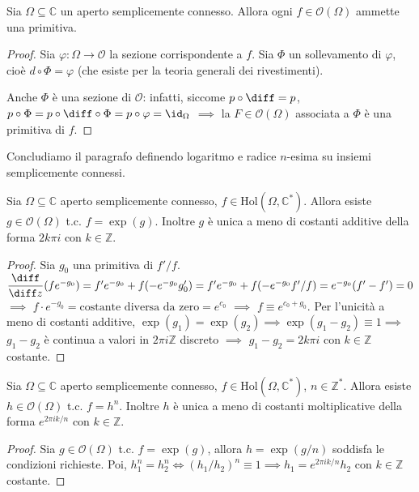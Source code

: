 \begin{thm}
  Sia $\Omega \subseteq \mathbb{C}$ un aperto semplicemente connesso. Allora ogni $f \in \mathcal{O}(\Omega)$ ammette una primitiva.
\end{thm}

\begin{proof}
  Sia $\varphi:\Omega \longrightarrow \mathcal{O}$ la sezione corrispondente a $f$. Sia $\Phi$ un sollevamento di $\varphi$, cioè $d \circ \Phi=\varphi$ (che esiste per la teoria generali dei rivestimenti).
  \begin{center}
  \end{center}
  Anche $\Phi$ è una sezione di $\mathcal{O}$: infatti, siccome $p \circ \diff=p$, $p \circ \Phi=p\circ\diff\circ\Phi=p\circ\varphi=\id_{\Omega}$ $\implies$ la $F \in \mathcal{O}(\Omega)$ associata a $\Phi$ è una primitiva di $f$.
\end{proof}

Concludiamo il paragrafo definendo logaritmo e radice $n$-esima su insiemi semplicemente connessi.

\begin{cor}
  Sia $\Omega \subseteq \mathbb{C}$ aperto semplicemente connesso, $f \in \text{Hol}(\Omega, \mathbb{C}^*)$. Allora esiste $g \in \mathcal{O}(\Omega)$ t.c. $f=\exp(g)$. Inoltre $g$ è unica a meno di costanti additive della forma $2k\pi i$ con $k \in \mathbb{Z}$.
\end{cor}

\begin{proof}
  Sia $g_0$ una primitiva di $f'/f$. $\dfrac{\diff}{\diff z}(fe^{-g_0})=f'e^{-g_0}+f(-e^{-g_0}g_0')=f'e^{-g_0}+f(-e^{-g_0}f'/f)=e^{-g_0}(f'-f')=0$ $\implies$ $f \cdot e^{-g_0}=\text{costante diversa da zero}=e^{c_0}$ $\implies$ $f\equiv e^{c_0+g_0}$.
  Per l'unicità a meno di costanti additive, $\exp(g_1)=\exp(g_2) \implies \exp(g_1-g_2)\equiv 1 \implies$ $g_1-g_2$ è continua a valori in $2\pi i \mathbb{Z}$ discreto $\implies$ $g_1-g_2=2k\pi i$ con $k \in \mathbb{Z}$ costante.
\end{proof}

\begin{cor}
  Sia $\Omega \subseteq \mathbb{C}$ aperto semplicemente connesso, $f \in \text{Hol}(\Omega, \mathbb{C}^*)$, $n \in \mathbb{Z}^*$. Allora esiste $h \in \mathcal{O}(\Omega)$ t.c. $f=h^n$. Inoltre $h$ è unica a meno di costanti moltiplicative della forma $e^{2\pi ik/n}$ con $k \in \mathbb{Z}$.
\end{cor}

\begin{proof}
  Sia $g \in \mathcal{O}(\Omega)$ t.c. $f=\exp(g)$, allora $h=\exp(g/n)$ soddisfa le condizioni richieste. Poi, $h_1^n=h_2^n \iff (h_1/h_2)^n\equiv 1 \implies h_1=e^{2\pi i k/n}h_2$ con $k \in \mathbb{Z}$ costante.
\end{proof}
